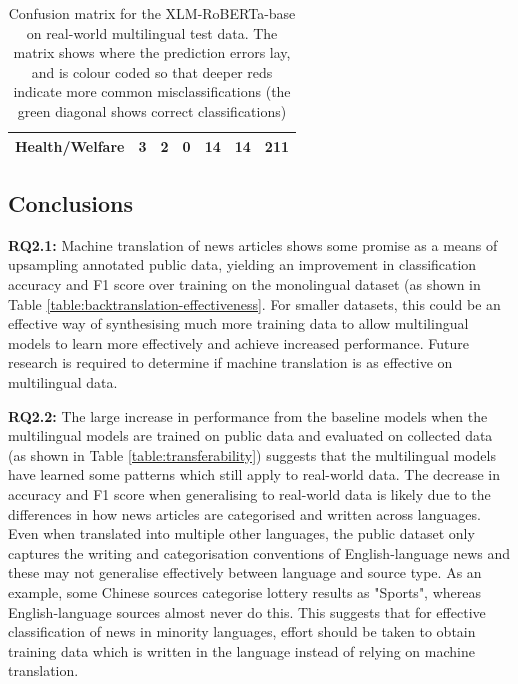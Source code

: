 \documentclass{l4proj}
\begin{document}
\begin{table}[h]
\begin{tabular}{lllllll}
\textbf{Health/Welfare}                   & \cellcolor[HTML]{FFCCC9}3            & \cellcolor[HTML]{FFCCC9}2            & 0                                    & \cellcolor[HTML]{FD6864}14           & \cellcolor[HTML]{FD6864}14           & \cellcolor[HTML]{67FD9A}\textbf{211} \\ \hline
\end{tabular}
\caption{Confusion matrix for the XLM-RoBERTa-base on real-world multilingual test data. The matrix shows where the prediction errors lay, and is colour coded so that deeper reds indicate more common misclassifications (the green diagonal shows correct classifications)}
\label{table:confusion_matrix}
\end{table}

\subsection{Conclusions}
\textbf{RQ2.1: } Machine translation of news articles shows some promise as a means of upsampling annotated public data, yielding an improvement in classification accuracy and F1 score over training on the monolingual dataset (as shown in Table \ref{table:backtranslation-effectiveness}. For smaller datasets, this could be an effective way of synthesising much more training data to allow multilingual models to learn more effectively and achieve increased performance. Future research is required to determine if machine translation is as effective on multilingual data. \par
\textbf{RQ2.2: } The large increase in performance from the baseline models when the multilingual models are trained on public data and evaluated on collected data (as shown in Table \ref{table:transferability}) suggests that the multilingual models have learned some patterns which still apply to real-world data. The decrease in accuracy and F1 score when generalising to real-world data is likely due to the differences in how news articles are categorised and written across languages. Even when translated into multiple other languages, the public dataset only captures the writing and categorisation conventions of English-language news and these may not generalise effectively between language and source type. As an example, some Chinese sources categorise lottery results as "Sports", whereas English-language sources almost never do this. This suggests that for effective classification of news in minority languages, effort should be taken to obtain training data which is written in the language instead of relying on machine translation. \par
\end{document}
